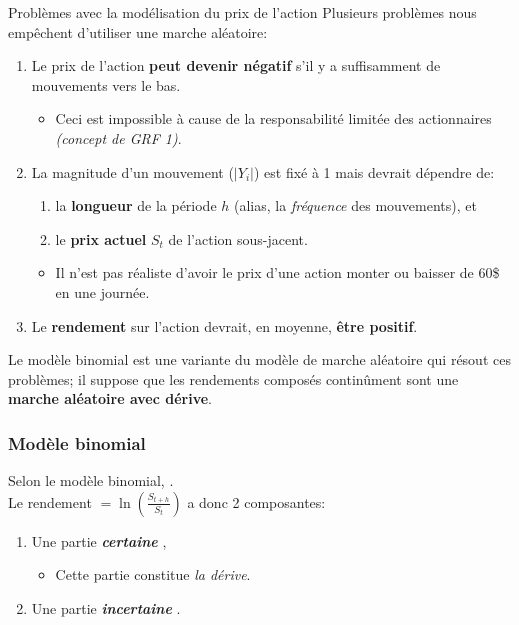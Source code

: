 \documentclass[10pt, french]{article}
\begin{document}
\begin{multicols*}{2}
\begin{conceptgen}{Problèmes avec la modélisation du prix de l'action}
Plusieurs problèmes nous empêchent d'utiliser une marche aléatoire:
\begin{enumerate}
	\item	Le prix de l'action \textbf{peut devenir négatif} s'il y a suffisamment de mouvements vers le bas. 
		\begin{itemize}
		\item	Ceci est impossible à cause de la responsabilité limitée des actionnaires \textit{(concept de GRF 1)}.
		\end{itemize}
	\item	La magnitude d'un mouvement ($|Y_{i}|$) est fixé à 1 mais devrait dépendre de: 
		\begin{enumerate}[label = \roman*)]
		\item	la \textbf{longueur} de la période $h$ (alias, la \textit{fréquence} des mouvements), et
		\item	le \textbf{prix actuel} $S_{t}$ de l'action sous-jacent.
		\end{enumerate}
		\begin{itemize}
		\item	Il n'est pas réaliste d'avoir le prix d'une action monter ou baisser de 60\$ en une journée.
		\end{itemize}
	\item	Le \textbf{rendement} sur l'action devrait, en moyenne, \textbf{être positif}.
\end{enumerate}
\end{conceptgen}



Le modèle binomial est une variante du modèle de marche aléatoire qui résout ces problèmes; il suppose que les rendements composés continûment sont une \textbf{marche aléatoire avec dérive}. 

\subsubsection{Modèle binomial}

Selon le modèle binomial, .\\
Le rendement 	$=	\ln\left(\frac{S_{t + h}}{S_{t}}\right)$	 a donc 2 composantes: 
\begin{enumerate}
	\item	Une partie \textit{\textbf{certaine}} ,
		\begin{itemize}
		\item	Cette partie constitue \textit{la dérive}.
		\end{itemize}
	\item	Une partie \textit{\textbf{incertaine}} .
\end{enumerate}


\end{multicols*}
\end{document}
